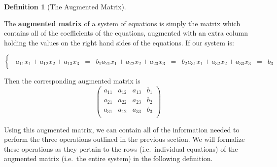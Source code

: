 \documentclass[
]{article}
\theoremstyle{definition}
\newtheorem{definition}{Definition}[section]
\theoremstyle{definition}
\theoremstyle{definition}
\theoremstyle{definition}
\theoremstyle{remark}
\begin{document}
\begin{definition}[The Augmented Matrix]
\protect\hypertarget{def:augmat}{}\label{def:augmat}

The \textbf{augmented matrix} of a system of equations is simply the matrix which contains all of the coefficients of the equations, augmented with an extra column holding the values on the right hand sides of the equations. If our system is:

\[\begin{cases}\begin{eqnarray}
a_{11}x_1+a_{12}x_2 +a_{13}x_3&=& b_1
a_{21}x_1+a_{22}x_2 +a_{23}x_3&=& b_2
a_{31}x_1+a_{32}x_2 +a_{33}x_3&=&b_3 \end{eqnarray}\end{cases}\]

Then the corresponding augmented matrix is
\[\left(\begin{array}{rrr|r}
a_{11}&a_{12}&a_{13}& b_1\\
a_{21}&a_{22}&a_{23}& b_2\\
a_{31}&a_{12}&a_{33}& b_3\\
\end{array}\right)\]

\end{definition}

Using this augmented matrix, we can contain all of the information needed to perform the three operations outlined in the previous section. We will formalize these operations as they pertain to the rows (i.e.~individual equations) of the augmented matrix (i.e.~the entire system) in the following definition.
\end{document}

